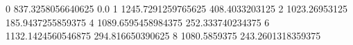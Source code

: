 0 837.3258056640625 0.0
1 1245.7291259765625 408.4033203125
2 1023.26953125 185.9437255859375
4 1089.6595458984375 252.333740234375
6 1132.1424560546875 294.816650390625
8 1080.5859375 243.2601318359375
